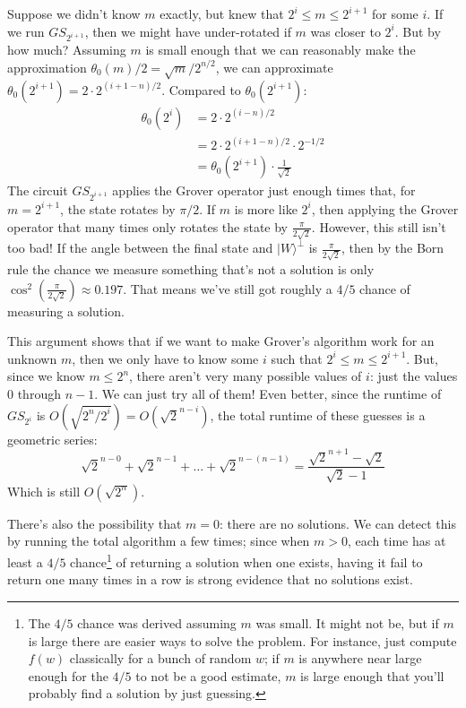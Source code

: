 \documentclass{article}
\newcommand{\ket}[1]{|#1\rangle}
\begin{document}
Suppose we didn't know $m$ exactly, but knew that $2^i \leq m \leq 2^{i+1}$ for some $i$. If we run $GS_{2^{i+1}}$, then we might have under-rotated if $m$ was closer to $2^i$. But by how much? Assuming $m$ is small enough that we can reasonably make the approximation $\theta_0(m)/2 = \sqrt{m}/2^{n/2}$, we can approximate $\theta_0(2^{i+1}) = 2 \cdot 2^{(i+1-n)/2}$. Compared to $\theta_0(2^{i+1})$:
\begin{align*}
\theta_0(2^i) &= 2 \cdot 2^{(i-n)/2} \\
&= 2 \cdot 2^{(i+1-n)/2} \cdot 2^{-1/2} \\
&= \theta_0(2^{i+1}) \cdot \frac{1}{\sqrt{2}}
\end{align*}
The circuit $GS_{2^{i+1}}$ applies the Grover operator just enough times that, for $m=2^{i+1}$, the state rotates by $\pi/2$. If $m$ is more like $2^i$, then applying the Grover operator that many times only rotates the state by $\frac{\pi}{2\sqrt{2}}$. However, this still isn't too bad! If the angle between the final state and $\ket{W}^{\perp}$ is $\frac{\pi}{2\sqrt{2}}$, then by the Born rule the chance we measure something that's not a solution is only $\cos^2\left(\frac{\pi}{2\sqrt{2}}\right) \approx 0.197$. That means we've still got roughly a $4/5$ chance of measuring a solution.

This argument shows that if we want to make Grover's algorithm work for an unknown $m$, then we only have to know some $i$ such that $2^i \leq m \leq 2^{i+1}$. But, since we know $m \leq 2^n$, there aren't very many possible values of $i$: just the values $0$ through $n-1$. We can just try all of them! Even better, since the runtime of $GS_{2^i}$ is $O(\sqrt{2^n/2^i}) = O(\sqrt{2}^{n-i})$, the total runtime of these guesses is a geometric series:
\[
\sqrt{2}^{n-0} + \sqrt{2}^{n-1} + \ldots + \sqrt{2}^{n-(n-1)} = \frac{\sqrt{2}^{n+1}-\sqrt{2}}{\sqrt{2}-1}
\]
Which is still $O(\sqrt{2^n})$.

There's also the possibility that $m=0$: there are no solutions. We can detect this by running the total algorithm a few times; since when $m>0$, each time has at least a $4/5$ chance\footnote{The $4/5$ chance was derived assuming $m$ was small. It might not be, but if $m$ is large there are easier ways to solve the problem. For instance, just compute $f(w)$ classically for a bunch of random $w$; if $m$ is anywhere near large enough for the $4/5$ to not be a good estimate, $m$ is large enough that you'll probably find a solution by just guessing.} of returning a solution when one exists, having it fail to return one many times in a row is strong evidence that no solutions exist.
\end{document}
